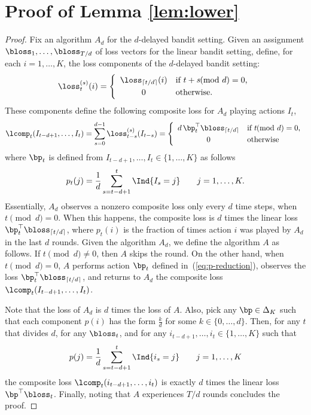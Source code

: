 \section{Proof of Lemma \ref{lem:lower}}

\begin{proof}
Fix an algorithm $A_d$ for the $d$-delayed bandit setting. Given an assignment $\bloss_1,\dots,\bloss_{T/d}$ of loss vectors for the linear bandit setting, define, for each $i=1,\dots,K$, the loss components of the $d$-delayed bandit setting:
\[
	\loss_t^{(s)}(i) = \left\{ \begin{array}{cl}
		\loss_{\lceil t/d\rceil}(i) & \text{if $t+s\!\!\!\pmod d=0$,}
	\\[1mm]
		0 & \text{otherwise.}
	\end{array} \right.
\]
These components define the following composite loss for $A_d$ playing actions $I_t$,
\[
	\lcomp_t(I_{t-d+1},\dots,I_t)
=
	\sum_{s=0}^{d-1} \loss_{t-s}^{(s)}(I_{t-s})
=	
	\left\{ \begin{array}{cl}
		d\,\bp_t^{\top}\bloss_{\lceil t/d\rceil} & \text{if $t\!\!\!\pmod d=0$,}
	\\[1mm]
		0 & \text{otherwise}
	\end{array} \right.
\]
where $\bp_t$ is defined from $I_{t-d+1},\dots,I_t \in \{1,\dots,K\}$ as follows
\begin{equation}
\label{eq:p-reduction}
	p_t(j) = \frac{1}{d}\sum_{s=t-d+1}^t \Ind{I_s = j} \qquad j=1,\dots,K.
\end{equation}
Essentially, $A_d$ observes a nonzero composite loss only every $d$ time steps, when $t\pmod d=0$. When this happens, the composite loss is $d$ times the linear loss $\bp_t^{\top}\bloss_{\lceil t/d\rceil}$, where $p_t(i)$ is the fraction of times action $i$ was played by $A_d$ in the last $d$ rounds.
%
Given the algorithm $A_d$, we define the algorithm $A$ as follows. If $t\pmod d\neq 0$, then $A$ skips the round. On the other hand, when $t\pmod d=0$, $A$ performs action $\bp_t$ defined in~(\ref{eq:p-reduction}), observes the loss $\bp_t^{\top}\bloss_{\lceil t/d\rceil}$, and returns to $A_d$ the composite loss $\lcomp_t(I_{t-d+1},\dots,I_t)$.

Note that the loss of $A_d$ is $d$ times the loss of $A$. Also, pick any $\bp\in\Delta_K$ such that each component $p(i)$ has the form $\frac{k}{d}$ for some $k\in\{0,\dots,d\}$. Then, for any $t$ that divides $d$, for any $\bloss_t$, and for any $i_{t-d+1},\dots,i_t\in\{1,\dots,K\}$ such that
\[
	p(j) = \frac{1}{d}\sum_{s=t-d+1}^t \Ind{i_s = j} \qquad j=1,\dots,K
\]
the composite loss $\lcomp_t(i_{t-d+1},\dots,i_t)$ is exactly $d$ times the linear loss $\bp^{\top}\bloss_t$. Finally, noting that $A$ experiences $T/d$ rounds concludes the proof.
\end{proof}





